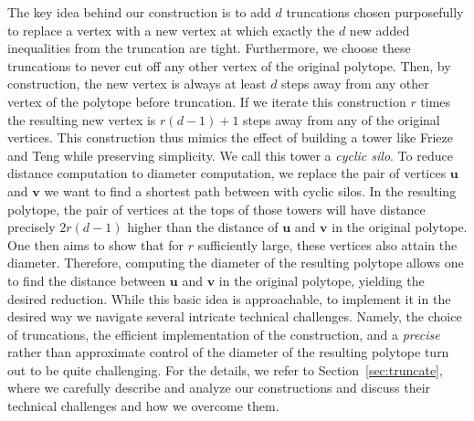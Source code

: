 \documentclass[centering,11pt,reqno]{amsart}
\theoremstyle{definition}
\begin{document}
The key idea behind our construction is to add $d$ truncations chosen purposefully to replace a vertex with a new vertex at which exactly the $d$ new added inequalities from the truncation are tight. Furthermore, we choose these truncations to never cut off any other vertex of the original polytope. Then, by construction, the new vertex is always at least $d$ steps away from any other vertex of the polytope before truncation. If we iterate this construction $r$ times the resulting new vertex is $r(d-1)+1$ steps away from any of the original vertices. This construction thus mimics the effect of building a tower like Frieze and Teng while preserving simplicity. We call this tower a \emph{cyclic silo}. To reduce distance computation to diameter computation, we replace the pair of vertices $\mathbf{u}$ and $\mathbf{v}$ we want to find a shortest path between with cyclic silos. In the resulting polytope, the pair of vertices at the tops of those towers will have distance precisely $2r(d-1)$ higher than the distance of $\mathbf{u}$ and $\mathbf{v}$ in the original polytope. One then aims to show that for $r$ sufficiently large, these vertices also attain the diameter. Therefore, computing the diameter of the resulting polytope allows one to find the distance between $\mathbf{u}$ and $\mathbf{v}$ in the original polytope, yielding the desired reduction. While this basic idea is approachable, to implement it in the desired way we navigate several intricate technical challenges. Namely, the choice of truncations, the efficient implementation of the construction, and a \emph{precise} rather than approximate control of the diameter of the resulting polytope turn out to be quite challenging. For the details, we refer to Section~\ref{sec:truncate}, where we carefully describe and analyze our constructions and discuss their technical challenges and how we overcome them.
\end{document}
